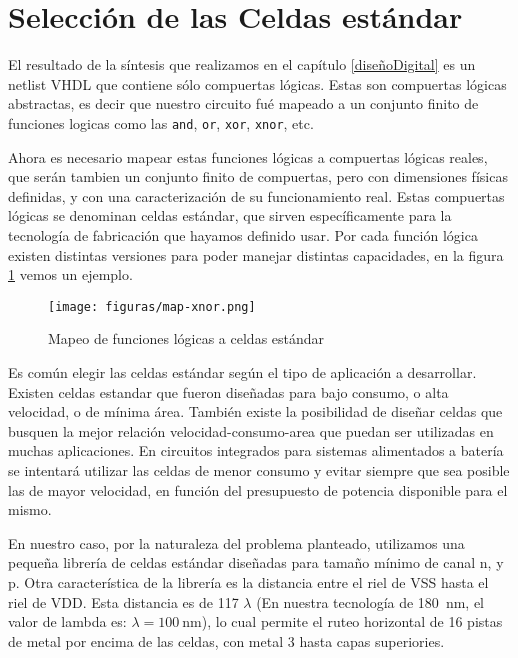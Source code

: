\section{Selección de las Celdas estándar}\label{celdasEstandars}
El resultado de la síntesis que realizamos en el capítulo \ref{diseñoDigital} es un netlist VHDL que contiene sólo compuertas lógicas. Estas son compuertas lógicas abstractas, es decir que nuestro circuito fué mapeado a un conjunto finito de funciones logicas como las \verb.and., \verb.or., \verb.xor., \verb.xnor., etc.

Ahora es necesario mapear estas funciones lógicas a compuertas lógicas reales, que serán tambien un conjunto finito de compuertas, pero con dimensiones físicas definidas, y con una caracterización de su funcionamiento real. Estas compuertas lógicas se denominan celdas estándar, que sirven específicamente para la tecnología de fabricación que hayamos definido usar. Por cada función lógica existen distintas versiones para poder manejar distintas capacidades, en la figura \ref{fig:map-xnor} vemos un ejemplo. 




\begin{figure}[h]
\centering
\texttt{[image: figuras/map-xnor.png]}
  \caption{Mapeo de funciones lógicas a celdas estándar}
  \label{fig:map-xnor}
\end{figure}

Es común elegir las celdas estándar según el tipo de aplicación a desarrollar. Existen celdas estandar que fueron diseñadas para bajo consumo, o alta velocidad, o de mínima área. También existe la posibilidad de diseñar celdas que busquen la mejor relación velocidad-consumo-area que puedan ser utilizadas en muchas aplicaciones. En circuitos integrados para sistemas alimentados a batería se intentará utilizar las celdas de menor consumo y evitar siempre que sea posible las de mayor velocidad, en función del presupuesto de potencia disponible para el mismo.

En nuestro caso, por la naturaleza del problema planteado, utilizamos una pequeña librería de celdas estándar diseñadas para tamaño mínimo de canal n, y p. %
Otra característica de la librería es la distancia entre el riel de VSS hasta el riel de VDD. Esta distancia es de 117 $\lambda$ (En nuestra tecnología de 180~$\mathrm{nm}$, el valor de lambda es: $\lambda = 100~\mathrm{nm}$), lo cual permite el ruteo horizontal de 16 pistas de metal por encima de las celdas, con metal 3 hasta capas superiories.

